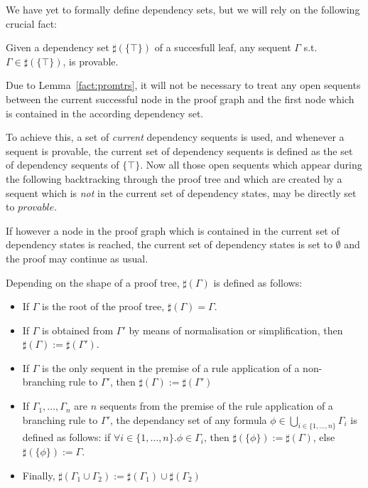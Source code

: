 \documentclass{llncs}
\begin{document}
We have yet to formally define dependency sets, but we will rely on the following
crucial fact:

\begin{lemma} Given a dependency set $\sharp(\{\top\})$ of a succesfull leaf, any
sequent $\Gamma$ s.t. $\Gamma\in \sharp(\{\top\})$, is provable.
\label{fact:promtrs}
\end{lemma}

Due to Lemma~\ref{fact:promtrs}, it will
not be necessary to treat any open sequents between the current successful node in the
proof graph and the first node which is contained in the according dependency set.

To achieve this, a set of \emph{current} dependency sequents is used, and whenever a
sequent is provable, the current set of dependency sequents is defined as the set of
dependency sequents of $\{\top\}$. Now all those open sequents which
appear during the following backtracking through the proof tree and which
are created by a sequent which is \emph{not} in the current set of dependency states,
may be directly set to $provable$.

If however a node in the proof graph which is contained in the current set of dependency
states is reached, the current set of dependency states is set to $\emptyset$ and the
proof may continue as usual.

\begin{definition} Depending on the shape of a proof tree, $\sharp(\Gamma)$ is defined as follows: 
\begin{itemize}
\item If $\Gamma$ is the root of the proof tree, $\sharp(\Gamma)=\Gamma$.
\item If $\Gamma$ is obtained from $\Gamma'$ by means of normalisation or simplification,
      then $\sharp(\Gamma):=\sharp(\Gamma')$.
\item If $\Gamma$ is the only sequent in the premise of a rule application of a non-branching rule to
$\Gamma'$, then $\sharp(\Gamma):=\sharp(\Gamma')$
\item If $\Gamma_1,\ldots,\Gamma_n$ are $n$ sequents from the premise of the rule
application of a branching rule to $\Gamma'$,
the dependancy set of any formula $\phi\in \bigcup_{i\in\{1,\ldots,n\}} \Gamma_i$ is
defined as follows: if $\forall i\in\{1,\ldots,n\}. \phi\in \Gamma_i$, then $\sharp(\{\phi\}):=\sharp(\Gamma)$,
else $\sharp(\{\phi\}):=\Gamma$.
\item Finally, $\sharp(\Gamma_1\cup \Gamma_2):=\sharp(\Gamma_1)\cup\sharp(\Gamma_2)$
\end{itemize}
\end{definition}
\end{document}
